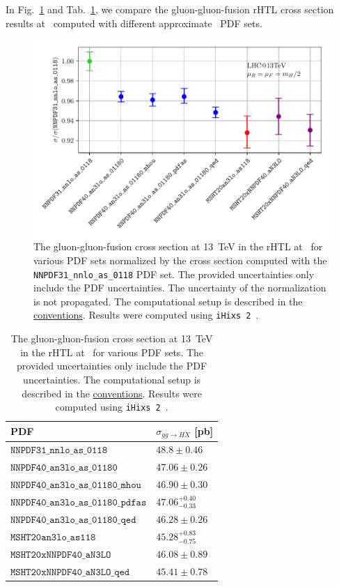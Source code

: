 In Fig.~\ref{fig:4:pdf_benchmark} and Tab.~\ref{tab:4:pdf_benchmark}, we compare the gluon-gluon-fusion \acs{rHTL} cross section results at \NNNLO\ computed with different approximate \NNNLO\ \acs{PDF} sets.
\begin{figure}[ht]
  \centering
  \includegraphics[width=\figurewidth]{Images/pdf_benchmark.pdf}
  \caption{The gluon-gluon-fusion cross section at 13~TeV in the \acs{rHTL} at \NNNLO\ for various \acs{PDF} sets normalized by the cross section computed with the \texttt{NNPDF31\_nnlo\_as\_0118} \acs{PDF} set. The provided uncertainties only include the \acs{PDF} uncertainties. The uncertainty of the normalization is not propagated. The computational setup is described in the \hyperref[chap:notation_and_conventions]{conventions}. Results were computed using \texttt{iHixs 2}~\cite{Dulat:2018rbf}.}
  \label{fig:4:pdf_benchmark}
\end{figure}
\begin{table}[ht]
  \centering
  \begin{tabular}{l l}
    \hline
    \acs{PDF} & $\sigma_{gg \rightarrow HX}$ [pb] \\
    \hline
    $\mathtt{NNPDF31\_nnlo\_as\_0118}$ & $48.8 \pm 0.46$ \\
    $\mathtt{NNPDF40\_an3lo\_as\_01180}$ & $47.06 \pm 0.26$ \\
    $\mathtt{NNPDF40\_an3lo\_as\_01180\_mhou}$ & $46.90 \pm 0.30$ \\
    $\mathtt{NNPDF40\_an3lo\_as\_01180\_pdfas}$ & $47.06 ^{{+0.40}}_{{-0.33}}$ \\
    $\mathtt{NNPDF40\_an3lo\_as\_01180\_qed}$ & $46.28 \pm 0.26$ \\
    $\mathtt{MSHT20an3lo\_as118}$ & $45.28 ^{{+0.83}}_{{-0.75}}$ \\
    $\mathtt{MSHT20xNNPDF40\_aN3LO}$ & $46.08 \pm 0.89$ \\
    $\mathtt{MSHT20xNNPDF40\_aN3LO\_qed}$ & $45.41 \pm 0.78$ \\
    \hline
  \end{tabular}
  \caption{The gluon-gluon-fusion cross section at 13~TeV in the \acs{rHTL} at \NNNLO\ for various \acs{PDF} sets. The provided uncertainties only include the \acs{PDF} uncertainties. The computational setup is described in the \hyperref[chap:notation_and_conventions]{conventions}. Results were computed using \texttt{iHixs 2}~\cite{Dulat:2018rbf}.}
  \label{tab:4:pdf_benchmark}
\end{table}
